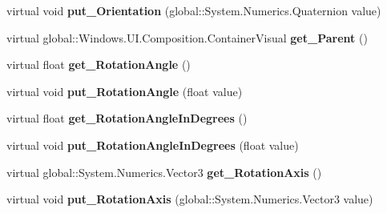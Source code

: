 \begin{DoxyCompactItemize}
\item 
\mbox{\label{class_windows_1_1_u_i_1_1_composition_1_1_visual_ab875fd373be5e98cf555fe044dfb879b}} 
virtual void {\bfseries put\+\_\+\+Orientation} (global\+::\+System.\+Numerics.\+Quaternion value)
\item 
\mbox{\label{class_windows_1_1_u_i_1_1_composition_1_1_visual_a26c62464881951a01cbced9fe2d055cf}} 
virtual global\+::\+Windows.\+U\+I.\+Composition.\+Container\+Visual {\bfseries get\+\_\+\+Parent} ()
\item 
\mbox{\label{class_windows_1_1_u_i_1_1_composition_1_1_visual_a46a0e2c6f7487264a8eb1652dd8716e6}} 
virtual float {\bfseries get\+\_\+\+Rotation\+Angle} ()
\item 
\mbox{\label{class_windows_1_1_u_i_1_1_composition_1_1_visual_a912ec0e9a447786e1502e1290aeb7f59}} 
virtual void {\bfseries put\+\_\+\+Rotation\+Angle} (float value)
\item 
\mbox{\label{class_windows_1_1_u_i_1_1_composition_1_1_visual_a6afa235bbf0eda06c026297cadc1b005}} 
virtual float {\bfseries get\+\_\+\+Rotation\+Angle\+In\+Degrees} ()
\item 
\mbox{\label{class_windows_1_1_u_i_1_1_composition_1_1_visual_ab913ab76eea8338f04b946c0fa8e8df1}} 
virtual void {\bfseries put\+\_\+\+Rotation\+Angle\+In\+Degrees} (float value)
\item 
\mbox{\label{class_windows_1_1_u_i_1_1_composition_1_1_visual_ae2a10f0e80dbd715f4a46226c4e1c6c0}} 
virtual global\+::\+System.\+Numerics.\+Vector3 {\bfseries get\+\_\+\+Rotation\+Axis} ()
\item 
\mbox{\label{class_windows_1_1_u_i_1_1_composition_1_1_visual_a7205a644c2e54e0465bfc32dff2ba814}} 
virtual void {\bfseries put\+\_\+\+Rotation\+Axis} (global\+::\+System.\+Numerics.\+Vector3 value)
\item 

\end{DoxyCompactItemize}
